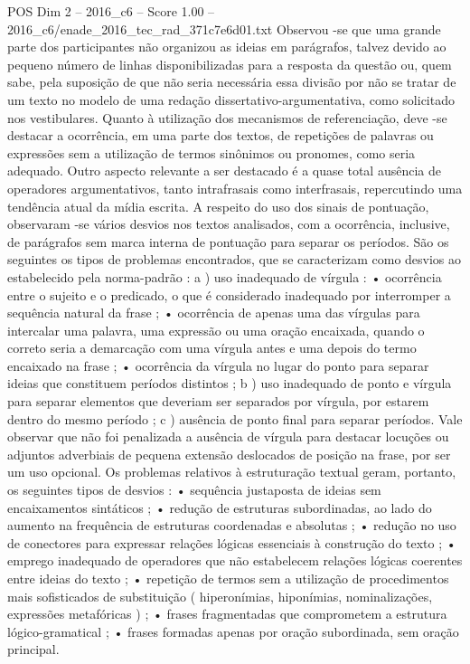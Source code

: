 \begin{textsample}{POS Dim 2 – 2016\_c6 – Score 1.00 – 2016\_c6/enade\_2016\_tec\_rad\_371c7e6d01.txt}
Observou -se que uma grande parte dos participantes não organizou as ideias em parágrafos, talvez devido ao pequeno número de linhas disponibilizadas para a resposta da questão ou, quem sabe, pela suposição de que não seria necessária essa divisão por não se tratar de um texto no modelo de uma redação dissertativo-argumentativa, como solicitado nos vestibulares.
Quanto à utilização dos mecanismos de referenciação, deve -se destacar a ocorrência, em uma parte dos textos, de repetições de palavras ou expressões sem a utilização de termos sinônimos ou pronomes, como seria adequado.
Outro aspecto relevante a ser destacado é a quase total ausência de operadores argumentativos, tanto intrafrasais como interfrasais, repercutindo uma tendência atual da mídia escrita.
A respeito do uso dos sinais de pontuação, observaram -se vários desvios nos textos analisados, com a ocorrência, inclusive, de parágrafos sem marca interna de pontuação para separar os períodos.
São os seguintes os tipos de problemas encontrados, que se caracterizam como desvios ao estabelecido pela norma-padrão : a ) uso inadequado de vírgula : • ocorrência entre o sujeito e o predicado, o que é considerado inadequado por interromper a sequência natural da frase ; • ocorrência de apenas uma das vírgulas para intercalar uma palavra, uma expressão ou uma oração encaixada, quando o correto seria a demarcação com uma vírgula antes e uma depois do termo encaixado na frase ; • ocorrência da vírgula no lugar do ponto para separar ideias que constituem períodos distintos ; b ) uso inadequado de ponto e vírgula para separar elementos que deveriam ser separados por vírgula, por estarem dentro do mesmo período ; c ) ausência de ponto final para separar períodos.
Vale observar que não foi penalizada a ausência de vírgula para destacar locuções ou adjuntos adverbiais de pequena extensão deslocados de posição na frase, por ser um uso opcional.
Os problemas relativos à estruturação textual geram, portanto, os seguintes tipos de desvios : • sequência justaposta de ideias sem encaixamentos sintáticos ; • redução de estruturas subordinadas, ao lado do aumento na frequência de estruturas coordenadas e absolutas ; • redução no uso de conectores para expressar relações lógicas essenciais à construção do texto ; • emprego inadequado de operadores que não estabelecem relações lógicas coerentes entre ideias do texto ; • repetição de termos sem a utilização de procedimentos mais sofisticados de substituição ( hiperonímias, hiponímias, nominalizações, expressões metafóricas ) ; • frases fragmentadas que comprometem a estrutura lógico-gramatical ; • frases formadas apenas por oração subordinada, sem oração principal.

\end{textsample}
